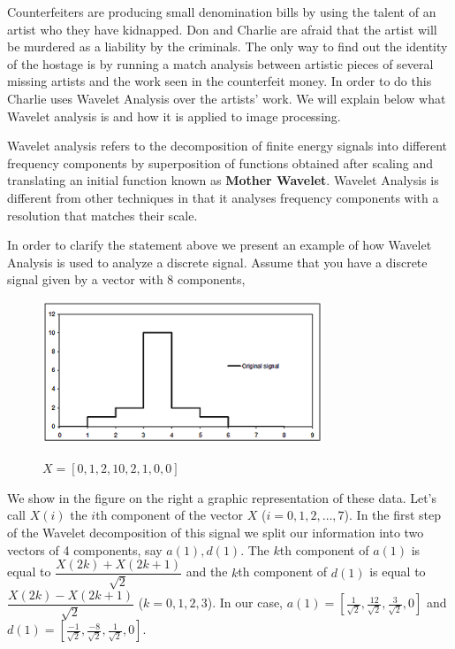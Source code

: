 \newpage
{}
{}
\setcounter{activity}{0}

Counterfeiters are producing small denomination bills by using the talent of an artist who they have kidnapped. Don and Charlie are afraid that the artist will be murdered as a liability by the criminals. The only way to find out the identity of the hostage is by running a match analysis between artistic pieces of several missing artists and the work seen in the counterfeit money. In order to do this Charlie uses Wavelet Analysis over the artists' work. We will explain below what Wavelet analysis is and how it is applied to image processing.



Wavelet analysis refers to the decomposition of finite energy signals into different frequency components by superposition of functions obtained after scaling and translating an initial function known as \textbf{Mother Wavelet}. Wavelet Analysis is different from other techniques in that it analyses frequency components with a resolution that matches their scale. 


In order to clarify the statement above we present an example of how Wavelet Analysis is used to analyze a discrete signal. Assume that you have a discrete signal given by a vector with 8 components,
	\begin{figure}[H]
	\centering
	\includegraphics[width=0.75\textwidth]{../sections/seasons/season1/107/images/original_signal.png} \par
	$X= [ 0, 1, 2, 10, 2, 1, 0, 0 ]$
	\end{figure}


We show in the figure on the right a graphic representation of these data. Let's call $X(i)$ the $i$th component of the vector $X$ ($i=  0, 1, 2, \ldots, 7$). In the first step of the Wavelet decomposition of this signal we split our information into two vectors of 4 components, say $a(1), d(1)$. The $k$th component of $a(1)$ is equal to $\dfrac{X(2k) + X(2k+1)}{\sqrt{2}}$ and the $k$th component of $d(1)$ is equal to $\dfrac{X(2k) - X(2k+1)}{\sqrt{2}}$ ($k= 0, 1, 2, 3$). In our case, $a(1)= \left[ \frac{1}{\sqrt{2}}, \frac{12}{\sqrt{2}}, \frac{3}{\sqrt{2}}, 0 \right]$ and $d(1)= \left[ \frac{-1}{\sqrt{2}}, \frac{-8}{\sqrt{2}}, \frac{1}{\sqrt{2}}, 0 \right]$.


